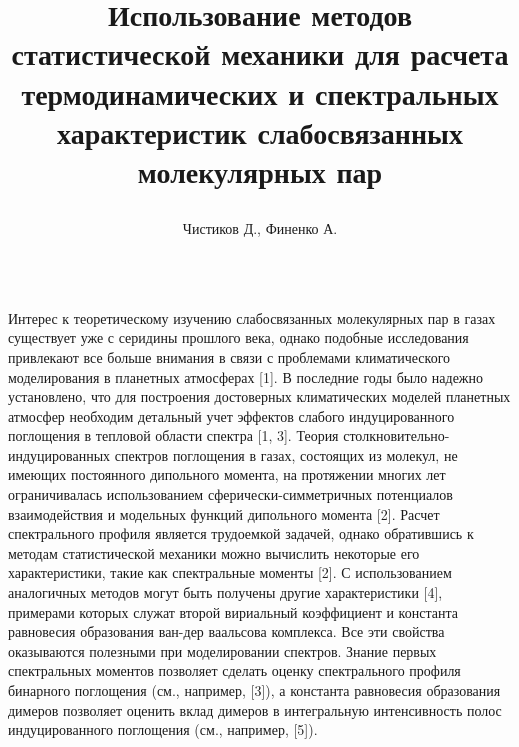 \documentclass[
  14pt,
  a1paper,
  portrait, 
  margin=0mm,
  innermargin=15mm,
  blockverticalspace=0mm,
  colspace=0mm,
  subcolspace=0mm
]{tikzposter}
\title{\parbox{0.75\linewidth}{\centering Использование методов статистической механики для расчета термодинамических и спектральных характеристик слабосвязанных молекулярных пар}}
\author{Чистиков Д., Финенко А.}
\institute{МГУ имени М.В. Ломоносова, Химический факультет}
\begin{document}
\maketitle[width=1.0\linewidth, titletotopverticalspace=0.1cm, titletoblockverticalspace=0.3cm]

\vspace*{-5cm}

\begin{columns}

{
	Интерес к теоретическому изучению слабосвязанных молекулярных пар в газах существует уже с серидины прошлого века, однако подобные исследования привлекают все больше внимания в связи с проблемами климатического моделирования в планетных атмосферах [1]. В последние годы было надежно установлено, что для построения достоверных климатических моделей планетных атмосфер необходим детальный учет эффектов слабого индуцированного поглощения в тепловой области спектра [1, 3]. Теория столкновительно-индуцированных спектров поглощения в газах, состоящих из молекул, не имеющих постоянного дипольного момента, на протяжении многих лет ограничивалась использованием сферически-симметричных потенциалов взаимодействия и модельных функций дипольного момента [2]. Расчет спектрального профиля является трудоемкой задачей, однако обратившись к методам статистической механики можно вычислить некоторые его характеристики, такие как спектральные моменты [2]. С использованием аналогичных методов могут быть получены другие характеристики [4], примерами которых служат второй вириальный коэффициент и константа равновесия образования ван-дер ваальсова комплекса. Все эти свойства оказываются полезными при моделировании спектров. Знание первых спектральных моментов позволяет сделать оценку спектрального профиля бинарного поглощения (см., например, [3]), а константа равновесия образования димеров позволяет оценить вклад димеров в интегральную интенсивность полос индуцированного поглощения (см., например, [5]). 
}


\end{columns}
\end{document}
